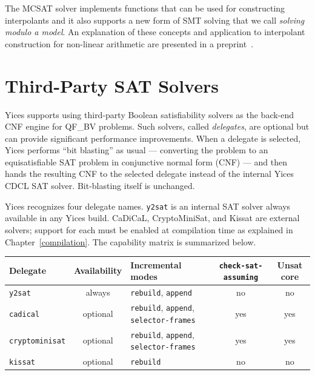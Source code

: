 \documentclass[11pt,twoside,fleqn,openright,titlepage]{cslreport}
\begin{document}
The MCSAT solver implements functions that can be used for
constructing interpolants and it also supports a new form of SMT
solving that we call {\em solving modulo a model\/}. An explanation
of these concepts and application to interpolant construction for
non-linear arithmetic are presented in a preprint~\cite{jovanovic2021interpolation}.

\section{Third-Party SAT Solvers}
\label{delegates}

Yices supports using third-party Boolean satisfiability solvers as the
back-end CNF engine for QF\_BV problems. Such solvers, called
\emph{delegates}, are optional but can provide significant performance
improvements. When a delegate is selected, Yices performs ``bit
blasting'' as usual --- converting the problem to an equisatisfiable
SAT problem in conjunctive normal form (CNF) --- and then hands the
resulting CNF to the selected delegate instead of the internal Yices
CDCL SAT solver. Bit-blasting itself is unchanged.

Yices recognizes four delegate names. \texttt{y2sat} is an internal
SAT solver always available in any Yices build. CaDiCaL,
CryptoMiniSat, and Kissat are external solvers; support for each must
be enabled at compilation time as explained in
Chapter~\ref{compilation}. The capability matrix is summarized below.
\begin{center}
\begin{tabular}{|l|c|p{1.75in}|c|c|}
\hline
Delegate            & Availability & Incremental modes &
                      \texttt{check-sat-assuming} & Unsat core \\
\hline
\texttt{y2sat}        & always  & \texttt{rebuild}, \texttt{append} & no & no \\
\texttt{cadical}      & optional & \texttt{rebuild}, \texttt{append}, \texttt{selector-frames} & yes & yes \\
\texttt{cryptominisat}& optional & \texttt{rebuild}, \texttt{append}, \texttt{selector-frames} & yes & yes \\
\texttt{kissat}       & optional & \texttt{rebuild} & no & no \\
\hline
\end{tabular}
\end{center}
\end{document}
